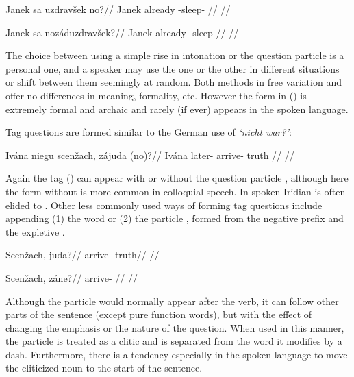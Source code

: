 \pex
\begingl
\gla Janek sa uzdrav\v{s}ek no?//
\glb Janek already -sleep- //
\glft {}//
\endgl
\xe

\pex{}
\begingl
\gla Janek sa noz\'aduzdrav\v{s}ek?//
\glb Janek already -sleep-//
\glft {}//
\endgl
\xe

The choice between using a simple rise in intonation or the question particle  is a personal one, and a speaker may use the one or the other in different situations or shift between them seemingly at random. Both methods in free variation and offer no differences in meaning, formality, etc. However the form in () is extremely formal and archaic and rarely (if ever) appears in the spoken language.

Tag questions are formed similar to the German use of \emph{`nicht war?'}:

\pex
\begingl
\gla Iv\'ana niegu scen\v{z}ach, z\'ajuda (no)?//
\glb Iv\'ana later- arrive- truth //
\glft {}//
\endgl
\xe

Again the tag  () can appear with or without the question particle , although here the form without  is more common in colloquial speech. In spoken Iridian  is often elided to . Other less commonly used ways of forming tag questions include appending (1) the word   or (2) the particle , formed from the negative prefix  and the expletive .

\pex
\a
\begingl
\gla Scen\v{z}ach, juda?//
\glb arrive- truth//
\glft {}//
\endgl

\a
\begingl
\gla Scen\v{z}ach, z\'ane?//
\glb arrive- //
\glft {}//
\endgl
\xe

Although the particle  would normally appear after the verb, it can follow other parts of the sentence (except pure function words), but with the effect of changing the emphasis or the nature of the question. When used in this manner, the particle is treated as a clitic and is separated from the word it modifies by a dash. Furthermore, there is a tendency especially in the spoken language to move the cliticized noun to the start of the sentence.


